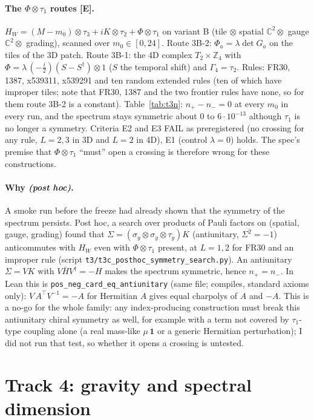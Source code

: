 \documentclass[10pt]{article}
\newcommand{\lab}[1]{\textbf{[#1]}}
\begin{document}
\paragraph{The $\Phi\otimes\tau_1$ routes \lab{E}.} $H_W=(M-m_0)\otimes\tau_3+iK\otimes\tau_2+\Phi\otimes\tau_1$ on variant B (tile $\otimes$ spatial $\mathbb C^2\otimes$ gauge $\mathbb C^2\otimes$ grading), scanned over $m_0\in[0,24]$. Route 3B-2: $\Phi_a=\lambda\det G_a$ on the tiles of the 3D patch. Route 3B-1: the 4D complex $T_2\times\mathbb Z_4$ with $\Phi=\lambda\,(-\tfrac i2)(S-S^\dagger)\otimes1$ ($S$ the temporal shift) and $\Gamma_4=\tau_2$. Rules: FR30, 1387, x539311, x539291 and ten random extended rules (ten of which have improper tiles; note that FR30, 1387 and the two frontier rules have none, so for them route 3B-2 is a constant). Table~\ref{tab:t3n}: $n_+-n_-=0$ at every $m_0$ in every run, and the spectrum stays symmetric about $0$ to $6\cdot10^{-13}$ although $\tau_1$ is no longer a symmetry. Criteria E2 and E3 FAIL as preregistered (no crossing for any rule, $L=2,3$ in 3D and $L=2$ in 4D), E1 (control $\lambda=0$) holds. The spec's premise that $\Phi\otimes\tau_1$ ``must'' open a crossing is therefore wrong for these constructions.


\paragraph{Why \emph{(post hoc)}.} A smoke run before the freeze had already shown that the symmetry of the spectrum persists. Post hoc, a search over products of Pauli factors on (spatial, gauge, grading) found that $\Sigma=(\sigma_y\otimes\sigma_y\otimes\tau_y)K$ (antiunitary, $\Sigma^2=-1$) anticommutes with $H_W$ even with $\Phi\otimes\tau_1$ present, at $L=1,2$ for FR30 and an improper rule (script \texttt{t3/t3c\_posthoc\_symmetry\_search.py}). An antiunitary $\Sigma=VK$ with $V\bar HV^\dagger=-H$ makes the spectrum symmetric, hence $n_+=n_-$. In Lean this is \texttt{pos\_neg\_card\_eq\_antiunitary} (same file; compiles, standard axioms only): $V\,A^{\!\top}V^{-1}=-A$ for Hermitian $A$ gives equal charpolys of $A$ and $-A$. This is a no-go for the whole family: any index-producing construction must break this antiunitary chiral symmetry as well, for example with a term not covered by $\tau_{1}$-type coupling alone (a real mass-like $\mu\,\mathbf 1$ or a generic Hermitian perturbation); I did not run that test, so whether it opens a crossing is untested.

\section{Track 4: gravity and spectral dimension}\label{sec:t4}
\end{document}
